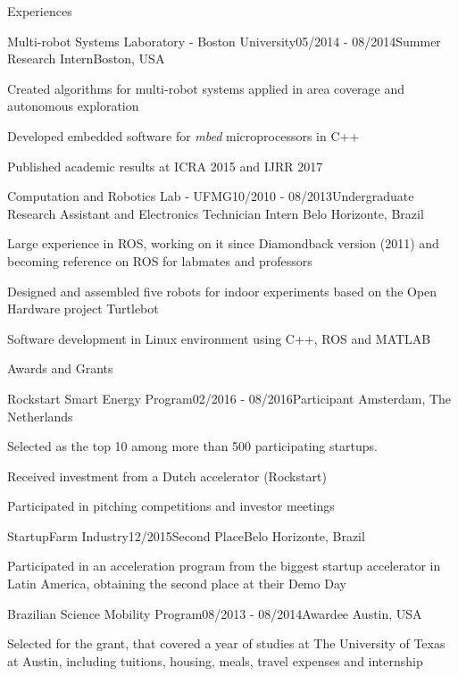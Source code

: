 \documentclass[14pt, a4paper]{resume} %
\begin{document}
\begin{rSection}{Experiences}
\begin{rSubsection}{Multi-robot Systems Laboratory - Boston University}{05/2014 - 08/2014}{\normalfont Summer Research Intern}{\normalfont Boston,  USA}
	\item Created algorithms for multi-robot systems applied in area coverage and autonomous exploration 
	\item Developed embedded software for \textit{mbed} microprocessors in C++
	\item Published academic results at ICRA 2015 and IJRR 2017
\end{rSubsection}


\begin{rSubsection}{Computation and Robotics Lab - UFMG}{10/2010 - 08/2013}{\normalfont Undergraduate Research Assistant and Electronics Technician Intern}{ \normalfont Belo Horizonte, Brazil}
	\item Large experience in ROS, working on it since Diamondback version (2011) and becoming reference on ROS for labmates and professors
 	\item Designed and assembled five robots for indoor experiments based on the Open Hardware project Turtlebot
 	\item Software development in Linux environment using C++, ROS and MATLAB
\end{rSubsection}
\end{rSection}


\begin{rSection}{Awards and Grants}
	\begin{rSubsection}{Rockstart Smart Energy Program}{02/2016 - 08/2016}{Participant}{ \normalfont Amsterdam, The Netherlands}
		\item Selected as the top 10 among more than 500 participating startups.
		\item Received investment from a Dutch accelerator (Rockstart)
		\item Participated in pitching competitions and investor meetings

	\end{rSubsection}
	
\begin{rSubsection}{StartupFarm Industry}{12/2015}{Second Place}{\normalfont Belo Horizonte, Brazil}
	\item Participated in an acceleration program from the biggest startup accelerator in Latin America, obtaining the second place at their Demo Day
\end{rSubsection}

\begin{rSubsection}{Brazilian Science Mobility Program}{08/2013 - 08/2014}{Awardee}{ \normalfont Austin, USA}
	\item Selected for the grant, that covered a year of studies at The University of Texas at Austin, including tuitions, housing, meals, travel expenses and internship
\end{rSubsection}

\end{rSection}
\end{document}
